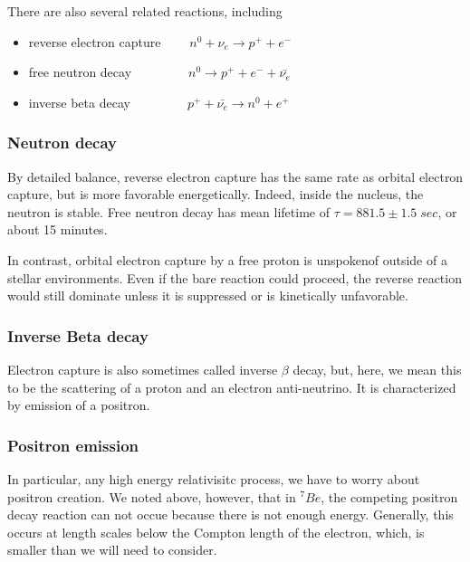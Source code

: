 \documentclass[11pt]{amsart}
\begin{document}
There are also several related reactions, including

\begin{itemize}
\item reverse electron capture  $\;\;\;\;\;\;\;n^{0}+\nu_{e}\rightarrow p^{+}+e^{-}$
\item free neutron decay  $\;\;\;\;\;\;\;\;\;\;\;\;\;\;\;n^{0}\rightarrow p^{+}+e^{-}+\bar{\nu_{e}}$ 
\item inverse beta decay  $\;\;\;\;\;\;\;\;\;\;\;\;\;\;\;p^{+}+\bar{\nu_{e}} \rightarrow n^{0}+e^{+}$
\end{itemize}



\subsubsection{Neutron decay}

By detailed balance,  reverse electron capture has the same rate as orbital electron capture,  but is more favorable energetically.  Indeed, inside the nucleus, the neutron is stable. Free neutron decay has mean lifetime of $\tau=881.5\pm1.5\;sec $, or about 15 minutes. 

In contrast, orbital electron capture by a free proton is unspokenof outside of a stellar environments. Even if the bare reaction could proceed, the reverse reaction would still dominate unless it is suppressed or is kinetically unfavorable. 

\subsubsection{Inverse Beta decay}

Electron capture is also sometimes called inverse $\beta$ decay, but, here, we mean this to be the scattering of a proton and an electron anti-neutrino.  It is characterized by emission of a positron. 

\subsubsection{Positron emission}

In particular, any high energy relativisitc process, we have to worry about positron creation.  We noted above, however, that in $^{7}Be$, the competing positron decay reaction can not occue because there is not enough energy.  Generally, this occurs at length scales below the Compton length of the electron, which, is smaller than we will need to consider.
\end{document}
